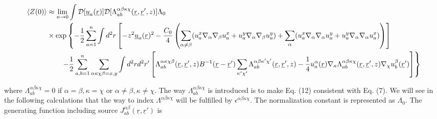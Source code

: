 \documentclass[twoside,twocolumn,9pt]{article}
\begin{document}
\begin{strip}
\begin{align}
\langle Z(0)\rangle&\approx\lim_{n\rightarrow0}\int\mathcal{D}[\underline{u}_a(\underline{r})]\mathcal{D}[\Lambda_{ab}^{\alpha\beta\kappa\chi}(\underline{r},\underline{r}',z)]\Lambda_0\notag\\
&\times\exp\left\{{-\frac{1}{2}\sum_{a=1}^n\int d^2r\left[-z^2\underline{u}_a(\underline{r})^2-\frac{C_0}{4}\left(\sum_{\alpha\neq\beta}(u^x_a\nabla_\alpha\nabla_\beta u^x_a+u^y_a\nabla_\alpha\nabla_\beta u^y_a)+\sum_{\alpha}(u^x_a\nabla_\alpha\nabla_\alpha u^y_a+u^y_a\nabla_\alpha\nabla_\alpha u^x_a)\right)\right]}\right.\notag\\
&\qquad\left.{-\frac{1}{2}\sum_{a,b=1}^n\sum_{\alpha\kappa\chi\beta=x,y}\int d^2rd^2r'\left[\Lambda_{ab}^{\alpha\kappa\chi\beta}(\underline{r},\underline{r}',z)B^{-1}(\underline{r}-\underline{r}')\sum_{\kappa'\chi'}\Lambda_{ab}^{\alpha\beta\kappa'\chi'}(\underline{r},\underline{r}',z)
-\frac{1}{4}u^\alpha_a(\underline{r})\nabla_{\kappa}\Lambda_{ab}^{\alpha\beta\kappa\chi}(\underline{r},\underline{r}',z)\nabla_{\chi}u^\beta_b(\underline{r}')\right]}\right\}
\end{align}
\end{strip}
where $\Lambda_{ab}^{\alpha\beta\kappa\chi}=0$ if $\alpha=\beta,\kappa=\chi$ or $\alpha\neq\beta,\kappa\neq\chi$.  The way $\Lambda_{ab}^{\alpha\beta\kappa\chi}$ is introduced is to make Eq. (12) consistent with Eq. (7). We will see in the following calculations that the way to index $\Lambda^{\alpha\beta\kappa\chi}$ will be fulfilled by $\epsilon^{\alpha\beta\kappa\chi}$. The normalization constant is represented as $\Lambda_0$.
The generating function including source $J_{ab}^{\alpha\beta}(\underline{r},\underline{r}')$ is
\end{document}
